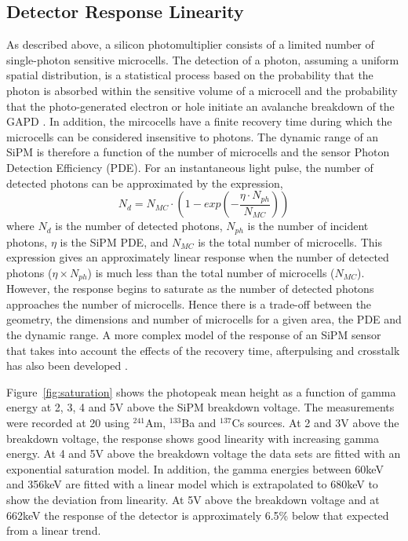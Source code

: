 \documentclass[journal]{IEEEtran}
\begin{document}
\subsection{Detector Response Linearity}
As described above, a silicon photomultiplier consists of a limited number of single-photon sensitive microcells. The detection of a photon, assuming a uniform spatial distribution, is a statistical process based on the probability that the photon is absorbed within the sensitive volume of a microcell and the probability that the photo-generated electron or hole initiate an avalanche breakdown of the GAPD \cite{geiger:mcintyre}. In addition, the mircocells have a finite recovery time during which the microcells can be considered insensitive to photons. The dynamic range of an SiPM is therefore a function of the number of microcells and the sensor Photon Detection Efficiency (PDE). For an instantaneous light pulse, the number of detected photons can be approximated by the expression,
\begin{equation} \label{first}
N_{d} = N_{MC}\cdot{}(1 - exp(-\frac{\eta{}\cdot{}N_{ph}}{N_{MC}}))
\end{equation}
where $N_{d}$ is the number of detected photons, $N_{ph}$ is the number of incident photons, $\eta$ is the SiPM PDE, and $N_{MC}$ is the total number of microcells. This expression gives an approximately linear response when the number of detected photons ($\eta{}\times{}N_{ph}$) is much less than the total number of microcells ($N_{MC}$). However, the response begins to saturate as the number of detected photons approaches the number of microcells. Hence there is a trade-off between the geometry, the dimensions and number of microcells for a given area, the PDE and the dynamic range. A more complex model of the response of an SiPM sensor that takes into account the effects of the recovery time, afterpulsing and crosstalk has also been developed \cite{model:dam}.

Figure~\ref{fig:saturation} shows the photopeak mean height as a function of gamma energy at 2, 3, 4 and 5V above the SiPM breakdown voltage. The measurements were recorded at 20\celsius{} using $^{241}$Am, $^{133}$Ba and $^{137}$Cs sources. At 2 and 3V above the breakdown voltage, the response shows good linearity with increasing gamma energy. At 4 and 5V above the breakdown voltage the data sets are fitted with an exponential saturation model. In addition, the gamma energies between 60keV and 356keV are fitted with a linear model which is extrapolated to 680keV to show the deviation from linearity. At 5V above the breakdown voltage and at 662keV the response of the detector is approximately 6.5\% below that expected from a linear trend. 
\end{document}
